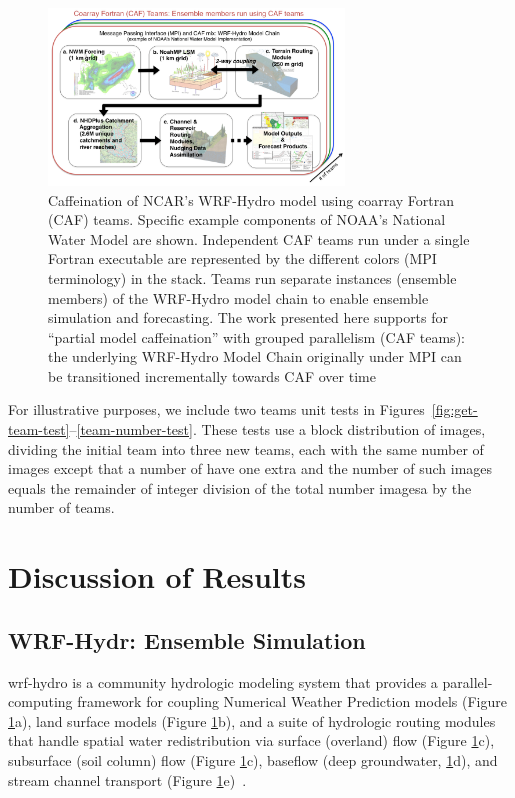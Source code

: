 \begin{figure}
\includegraphics[width=0.7\textwidth]{figures/WRF-Hydro-caf-ens-model_chain.png}
\vspace{-7pt}
\caption{Caffeination of NCAR's WRF-Hydro model using coarray Fortran (CAF)
  teams. Specific example components of  NOAA's National Water
  Model are shown. Independent CAF teams run under a single Fortran executable are represented by the different colors
  (MPI terminology) in the stack.  Teams run separate instances
  (ensemble members) of the WRF-Hydro model chain to enable ensemble
  simulation and forecasting. The work presented  here supports for ``partial model caffeination'' with grouped
  parallelism (CAF teams): the underlying WRF-Hydro Model Chain
  originally under MPI can be transitioned incrementally towards CAF
  over time\label{fig:caffeinate-wrf-hydro}}
\end{figure}
%

For illustrative purposes, we include two teams unit tests in
Figures~\ref{fig:get-team-test}--\ref{team-number-test}.  These tests use a block distribution of images,
dividing the initial team into three new teams, each with the same number of images except that a number of
have one extra and the number of such images equals the remainder of integer division of the total
number imagesa by the number of teams.

\section{Discussion of Results}\label{sec:discussion}
\subsection{WRF-Hydr: Ensemble Simulation}
\gls{wrf-hydro} is a community hydrologic modeling system that provides a parallel-computing
framework for coupling Numerical Weather Prediction models (Figure \ref{fig:caffeinate-wrf-hydro}a), land surface models
(Figure \ref{fig:caffeinate-wrf-hydro}b), and a suite of hydrologic routing modules that handle spatial water redistribution
via surface (overland) flow (Figure \ref{fig:caffeinate-wrf-hydro}c), subsurface (soil column) flow (Figure \ref{fig:caffeinate-wrf-hydro}c),
baseflow (deep groundwater, \ref{fig:caffeinate-wrf-hydro}d), and stream channel transport
(Figure \ref{fig:caffeinate-wrf-hydro}e)~\cite{gochisEtal2014}.

